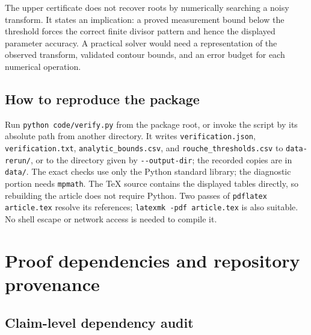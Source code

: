 \documentclass[11pt,a4paper]{article}
\numberwithin{equation}{section}
\theoremstyle{definition}
\theoremstyle{remark}
\begin{document}
The upper certificate does not recover roots by numerically searching a noisy
transform. It states an implication: a proved measurement bound below the
threshold forces the correct finite divisor pattern and hence the displayed
parameter accuracy. A practical solver would need a representation of the
observed transform, validated contour bounds, and an error budget for each
numerical operation.

\subsection{How to reproduce the package}

Run \texttt{python code/verify.py} from the package root, or invoke the
script by its absolute path from another directory. It writes
\nolinkurl{verification.json}, \nolinkurl{verification.txt},
\nolinkurl{analytic_bounds.csv}, and \nolinkurl{rouche_thresholds.csv}
to \nolinkurl{data-rerun/}, or to the directory given by
\texttt{-{}-output-dir}; the recorded copies are in \nolinkurl{data/}. The exact checks use only the Python
standard library; the diagnostic portion needs \texttt{mpmath}.
The TeX source contains the displayed tables directly, so rebuilding the
article does not require Python. Two passes of \texttt{pdflatex article.tex}
resolve its references; \texttt{latexmk -pdf article.tex} is also suitable.
No shell escape or network access is needed to compile it.

\section{Proof dependencies and repository provenance}
\label{sec:provenance}

\subsection{Claim-level dependency audit}
\end{document}
